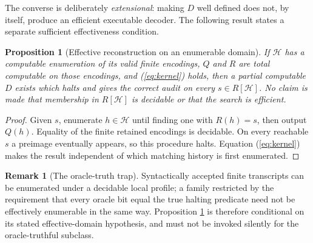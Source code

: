 \documentclass[11pt,letterpaper]{article}
\newtheorem{proposition}[theorem]{Proposition}
\theoremstyle{definition}
\newtheorem{remark}[theorem]{Remark}
\newcommand{\Hh}{\mathcal H}
\begin{document}
The converse is deliberately \emph{extensional}: making $D$ well defined does not, by itself, produce an efficient executable decoder. The following result states a separate sufficient effectiveness condition.

\begin{proposition}[Effective reconstruction on an enumerable domain]\label{prop:effective}
If $\Hh$ has a computable enumeration of its valid finite encodings, $Q$ and $R$ are total computable on those encodings, and (\ref{eq:kernel}) holds, then a partial computable $D$ exists which halts and gives the correct audit on every $s\in R[\Hh]$. No claim is made that membership in $R[\Hh]$ is decidable or that the search is efficient.
\end{proposition}
\begin{proof}
Given $s$, enumerate $h\in\Hh$ until finding one with $R(h)=s$, then output $Q(h)$. Equality of the finite retained encodings is decidable. On every reachable $s$ a preimage eventually appears, so this procedure halts. Equation (\ref{eq:kernel}) makes the result independent of which matching history is first enumerated.
\end{proof}

\begin{remark}[The oracle-truth trap]
Syntactically accepted finite transcripts can be enumerated under a decidable local profile; a family restricted by the requirement that every oracle bit equal the true halting predicate need not be effectively enumerable in the same way. Proposition \ref{prop:effective} is therefore conditional on its stated effective-domain hypothesis, and must not be invoked silently for the oracle-truthful subclass.
\end{remark}
\end{document}
